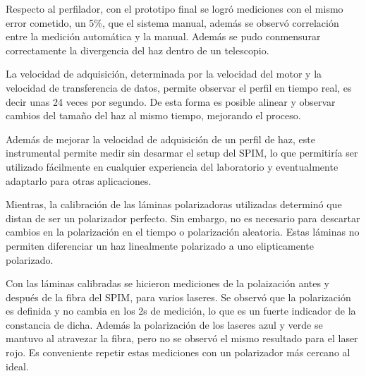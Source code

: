 Respecto al perfilador, con el prototipo final se logró mediciones con el mismo error cometido, un 5\%, que el sistema manual, además se observó correlación entre la medición automática y la manual. Además se pudo conmensurar correctamente la divergencia del haz dentro de un telescopio.  

La velocidad de adquisición, determinada por la velocidad del motor y la velocidad de transferencia de datos, permite observar el perfil en tiempo real, es decir unas 24 veces por segundo. De esta forma es posible alinear y observar cambios del tamaño del haz al mismo tiempo, mejorando el proceso.

Además de mejorar la velocidad de adquisición de un perfil de haz, este instrumental permite medir sin desarmar el setup del SPIM, lo que permitiría ser utilizado fácilmente en cualquier experiencia del laboratorio y eventualmente adaptarlo para otras aplicaciones.

Mientras, la calibración de las láminas polarizadoras utilizadas determinó que distan de ser un polarizador perfecto. Sin embargo, no es necesario para descartar cambios en la polarización en el tiempo o polarización aleatoria. Estas láminas no permiten diferenciar un haz linealmente polarizado a uno elipticamente polarizado. 

Con las láminas calibradas se hicieron mediciones de la polaización antes y después de la fibra del SPIM, para varios laseres. Se observó que la polarización es definida y no cambia en los 2s de medición, lo que es un fuerte indicador de la constancia de dicha. Además la polarización de los laseres azul y verde se mantuvo al atravezar la fibra, pero no se observó el mismo resultado para el laser rojo. Es conveniente repetir estas mediciones con un polarizador más cercano al ideal.
